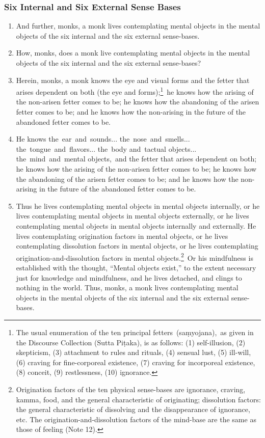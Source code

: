 \documentclass[a4 paper, 12pt]{article}
\begin{document}
\subsubsection*{Six Internal and Six External Sense Bases}
\begin{enumerate}[resume]
\item And further, monks, a monk lives contemplating mental objects in the mental objects of the six internal and the six external sense-bases.
\item How, monks, does a monk live contemplating mental objects in the mental objects of the six internal and the six external sense-bases?
\item Herein, monks, a monk knows the eye and visual forms and the fetter that arises dependent on both (the eye and forms);\footnote{The usual enumeration of the ten principal fetters (saṃyojana), as given in the Discourse Collection (Sutta Piṭaka), is as follows: (1) self-illusion, (2) skepticism, (3) attachment to rules and rituals, (4) sensual lust, (5) ill-will, (6) craving for fine-corporeal existence, (7) craving for incorporeal existence, (8) conceit, (9) restlessness, (10) ignorance.} he knows how the arising of the non-arisen fetter comes to be; he knows how the abandoning of the arisen fetter comes to be; and he knows how the non-arising in the future of the abandoned fetter comes to be.
\item He knows the ear and sounds... the nose and smells... the tongue and flavors... the body and tactual objects... the mind and mental objects, and the fetter that arises dependent on both; he knows how the arising of the non-arisen fetter comes to be; he knows how the abandoning of the arisen fetter comes to be; and he knows how the non-arising in the future of the abandoned fetter comes to be.
\item Thus he lives contemplating mental objects in mental objects internally, or he lives contemplating mental objects in mental objects externally, or he lives contemplating mental objects in mental objects internally and externally. He lives contemplating origination factors in mental objects, or he lives contemplating dissolution factors in mental objects, or he lives contemplating origination-and-dissolution factors in mental objects.\footnote{Origination factors of the ten physical sense-bases are ignorance, craving, kamma, food, and the general characteristic of originating; dissolution factors: the general characteristic of dissolving and the disappearance of ignorance, etc. The origination-and-dissolution factors of the mind-base are the same as those of feeling (Note 12).} Or his mindfulness is established with the thought, “Mental objects exist,” to the extent necessary just for knowledge and mindfulness, and he lives detached, and clings to nothing in the world. Thus, monks, a monk lives contemplating mental objects in the mental objects of the six internal and the six external sense-bases.
\end{enumerate}
\end{document}
